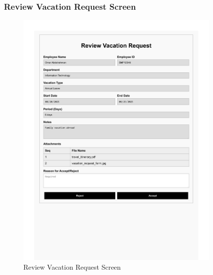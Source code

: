 \documentclass[12pt,a4paper]{article}
\begin{document}
\subsubsection{Review Vacation Request Screen}
\begin{figure}[H]
\centering
\includegraphics[width=0.9\textwidth]{Wireframes/Review-Vacation-Request/Review-Vacation-Request-1.png}
\caption{Review Vacation Request Screen}
\label{fig:review-vacation-screen}
\end{figure}
\end{document}
